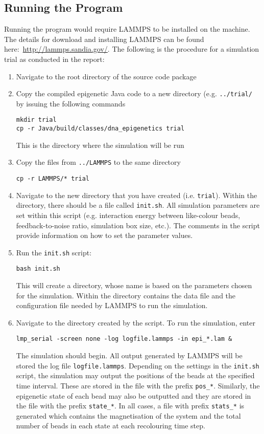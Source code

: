 \documentclass[12pt]{article}
\begin{document}
\subsection{Running the Program}
Running the program would require LAMMPS to be installed on the machine. The details for download and installing LAMMPS can be found here:~\url{http://lammps.sandia.gov/}. The following is the procedure for a simulation trial as conducted in the report:
\begin{enumerate}
\item Navigate to the root directory of the source code package
\item Copy the compiled epigenetic Java code to a new directory (e.g. \texttt{../trial/} by issuing the following commands
\begin{lstlisting}
mkdir trial
cp -r Java/build/classes/dna_epigenetics trial
\end{lstlisting}
This is the directory where the simulation will be run
\item Copy the files from \texttt{../LAMMPS} to the same directory
\begin{lstlisting}
cp -r LAMMPS/* trial
\end{lstlisting}
\item Navigate to the new directory that you have created (i.e. \texttt{trial}). Within the directory, there should be a file called \texttt{init.sh}. All simulation parameters are set within this script (e.g. interaction energy between like-colour beads, feedback-to-noise ratio, simulation box size, etc.). The comments in the script provide information on how to set the parameter values.
\item Run the \texttt{init.sh} script:
\begin{lstlisting}
bash init.sh
\end{lstlisting}
This will create a directory, whose name is based on the parameters chosen for the simulation. Within the directory contains the data file and the configuration file needed by LAMMPS to run the simulation.
\item Navigate to the directory created by the script. To run the simulation, enter
\begin{lstlisting}
lmp_serial -screen none -log logfile.lammps -in epi_*.lam &
\end{lstlisting}
The simulation should begin. All output generated by LAMMPS will be stored the log file \texttt{logfile.lammps}. Depending on the settings in the \texttt{init.sh} script, the simulation may output the positions of the beads at the specified time interval. These are stored in the file with the prefix \texttt{pos\_*}. Similarly, the epigenetic state of each bead may also be outputted and they are stored in the file with the prefix \texttt{state\_*}. In all cases, a file with prefix \texttt{stats\_*} is generated which contains the magnetisation of the system and the total number of beads in each state at each recolouring time step.
\end{enumerate}
\end{document}
